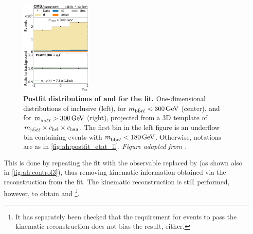 \begin{figure}[p]
    \hfill
    \includegraphics[width=0.32\textwidth]{figures/ah/prepost/EtaT_mbbllspin_fit_s_ll_run2_both_chel_mbbllgt300.pdf}
    \caption{
        \label{fig:ah:postfit_mbbll}
        \textbf{Postfit distributions of \mbbll and \chel for the \etat fit.} One-dimensional distributions of inclusive \mbbll (left), \chel for $\mbbll < \SI{300}{\GeV}$ (center), and \chel for $\mbbll > \SI{300}{\GeV}$ (right), projected from a 3D template of $m_{\mathrm{b\bar{b}\ell\ell}} \times c_{\mathrm{hel}} \times c_{\mathrm{han}}$. The first \mbbll bin in the left figure is an underflow bin containing events with $\mbbll < \SI{180}{\GeV}$. Otherwise, notations are as in \cref{fig:ah:postfit_etat_ll}. \textit{Figure adapted from }.
    }  
\end{figure}


This is done by repeating the fit with the observable \mtt replaced by \mbbll (as shown also in \cref{fig:ah:control3}), thus removing kinematic information obtained via the reconstruction from the fit. The kinematic reconstruction is still performed, however, to obtain \chel and \chan\footnote{It has separately been checked that the requirement for events to pass the kinematic reconstruction does not bias the result, either.}. %

